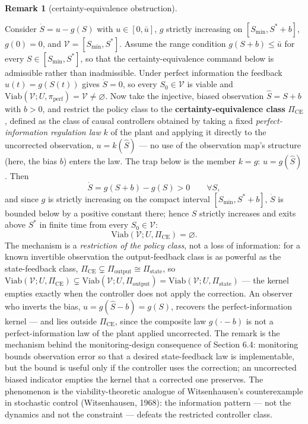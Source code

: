 \documentclass[11pt]{article}
\theoremstyle{definition}
\newtheorem{remark}{Remark}
\begin{document}
\begin{remark}[certainty-equivalence obstruction]\label{rem:ce-trap}

Consider
\(\dot S = u - g(S)\) with \(u \in [0, \bar u]\), \(g\) strictly
increasing on \([S_{\min}, S^* + b]\), \(g(0) = 0\), and
\(\mathcal{V} = [S_{\min}, S^*]\). Assume the range condition
\(g(S + b) \le \bar u\) for every \(S \in [S_{\min}, S^*]\), so that the
certainty-equivalence command below is admissible rather than
inadmissible. Under perfect information the feedback \(u(t) = g(S(t))\)
gives \(\dot S = 0\), so every \(S_0 \in \mathcal{V}\) is viable and
\(\mathrm{Viab}(\mathcal{V}; U, \pi_{\mathrm{perf}}) = \mathcal{V} \neq \varnothing\).
Now take the injective, biased observation \(\hat S = S + b\) with
\(b > 0\), and restrict the policy class to the
\textbf{certainty-equivalence class} \(\Pi_{\mathrm{CE}}\), defined as the class of causal controllers obtained by taking a fixed \emph{perfect-information
regulation law} \(k\) of the plant and applying it directly to the
uncorrected observation, \(u = k(\hat S)\) --- no use of the observation
map's structure (here, the bias \(b\)) enters the law. The trap below is
the member \(k = g\): \(u = g(\hat S)\). Then
\[\dot S = g(S + b) - g(S) > 0 \qquad \forall S,\] and since \(g\) is
strictly increasing on the compact interval \([S_{\min}, S^* + b]\),
\(\dot S\) is bounded below by a positive constant there; hence \(S\)
strictly increases and exits above \(S^*\) in finite time from every
\(S_0 \in \mathcal{V}\):
\[\mathrm{Viab}(\mathcal{V}; U, \Pi_{\mathrm{CE}}) = \varnothing.\] The
mechanism is a \emph{restriction of the policy class}, not a loss of
information: for a known invertible observation the output-feedback
class is as powerful as the state-feedback class,
\(\Pi_{\mathrm{CE}} \subsetneq \Pi_{\mathrm{output}} \cong \Pi_{\mathrm{state}}\),
so
\(\mathrm{Viab}(\mathcal{V}; U, \Pi_{\mathrm{CE}}) \subsetneq \mathrm{Viab}(\mathcal{V}; U, \Pi_{\mathrm{output}}) = \mathrm{Viab}(\mathcal{V}; U, \Pi_{\mathrm{state}})\)
--- the kernel empties exactly when the controller does not apply the correction. An observer who inverts the bias,
\(u = g(\hat S - b) = g(S)\), recovers the perfect-information kernel
--- and lies outside \(\Pi_{\mathrm{CE}}\), since the composite law
\(g(\cdot - b)\) is not a perfect-information law of the plant applied
uncorrected. The remark is the mechanism behind the monitoring-design
consequence of Section 6.4: monitoring bounds observation error so that
a desired state-feedback law is implementable, but the bound is useful
only if the controller uses the correction; an uncorrected biased
indicator empties the kernel that a corrected one preserves. The
phenomenon is the viability-theoretic analogue of Witsenhausen's
counterexample in stochastic control (Witsenhausen, 1968): the
information pattern --- not the dynamics and not the constraint ---
defeats the restricted controller class.

\end{remark}
\end{document}
